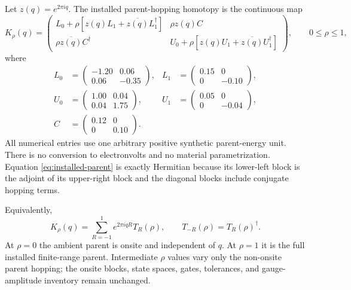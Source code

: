 Let $z(q)=e^{2\pi iq}$.  The installed parent-hopping homotopy is the continuous map
\begin{equation}
 K_\rho(q)=
 \begin{pmatrix}
 L_0+\rho[z(q)L_1+\overline{z(q)}L_1^\dagger]&\rho z(q)C\\
 \rho\overline{z(q)}C^\dagger&
 U_0+\rho[z(q)U_1+\overline{z(q)}U_1^\dagger]
 \end{pmatrix},
 \qquad 0\le\rho\le1,
 \label{eq:installed-parent}
\end{equation}
where
\begin{align}
 L_0&=\begin{pmatrix}-1.20&0.06\\0.06&-0.35\end{pmatrix},&
 L_1&=\begin{pmatrix}0.15&0\\0&-0.10\end{pmatrix},\\
 U_0&=\begin{pmatrix}1.00&0.04\\0.04&1.75\end{pmatrix},&
 U_1&=\begin{pmatrix}0.05&0\\0&-0.04\end{pmatrix},\\
 C&=\begin{pmatrix}0.12&0\\0&0.10\end{pmatrix}.
 \label{eq:installed-blocks}
\end{align}
All numerical entries use one arbitrary positive synthetic parent-energy unit.  There
is no conversion to electronvolts and no material parametrization.  Equation
\eqref{eq:installed-parent} is exactly Hermitian because its lower-left block is the
adjoint of its upper-right block and the diagonal blocks include conjugate hopping
terms.

Equivalently,
\begin{equation}
 K_\rho(q)=\sum_{R=-1}^{1}e^{2\pi iqR}T_R(\rho),
 \qquad T_{-R}(\rho)=T_R(\rho)^\dagger.
 \label{eq:finite-parent-series}
\end{equation}
At $\rho=0$ the ambient parent is onsite and independent of $q$.  At $\rho=1$ it is the
full installed finite-range parent.  Intermediate $\rho$ values vary only the non-onsite
parent hopping; the onsite blocks, state spaces, gates, tolerances, and gauge-amplitude
inventory remain unchanged.

